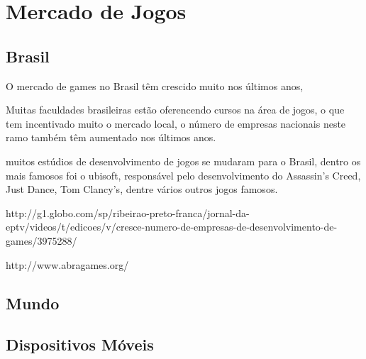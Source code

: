 
\chapter{Mercado de Jogos}
\label{cap:mercadoJogos}


\section{Brasil}

O mercado de games no Brasil têm crescido muito nos últimos anos, 


Muitas faculdades brasileiras estão oferencendo cursos na área de jogos, o que tem incentivado muito o mercado local, o número de empresas nacionais neste ramo também têm aumentado nos últimos anos.


muitos estúdios de desenvolvimento de jogos se mudaram para o Brasil, dentro os mais famosos foi o ubisoft, responsável pelo desenvolvimento do Assassin's Creed, Just Dance, Tom Clancy's, dentre vários outros jogos famosos.










http://g1.globo.com/sp/ribeirao-preto-franca/jornal-da-eptv/videos/t/edicoes/v/cresce-numero-de-empresas-de-desenvolvimento-de-games/3975288/

http://www.abragames.org/








\section{Mundo}



\section{Dispositivos Móveis}
